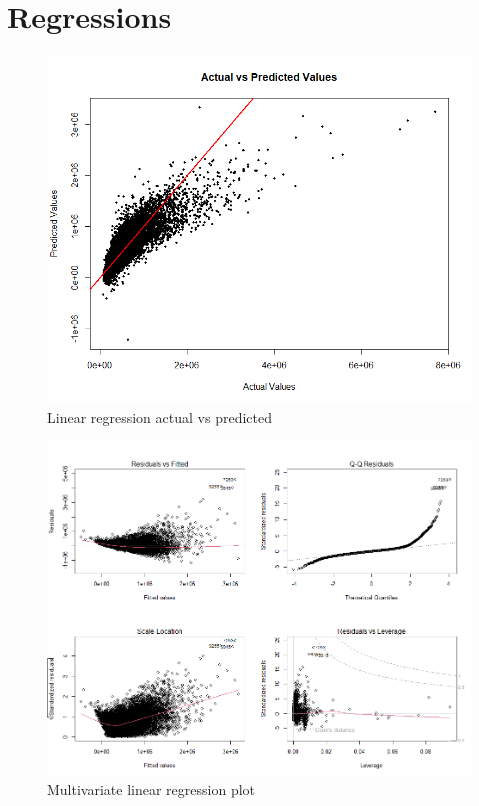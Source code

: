 \documentclass[a4paper, 11pt]{article}
\begin{document}
\section{Regressions}

\begin{figure}[H]
\includegraphics[scale=0.5]{MLRpred}
\centering
\caption{Linear regression actual vs predicted}
\label{fig:MLRpred}
\end{figure}


\begin{figure}[H]
\includegraphics[scale=0.45]{MLR}
\centering
\caption{Multivariate linear regression plot}
\label{fig:MLR}
\end{figure}
\end{document}
